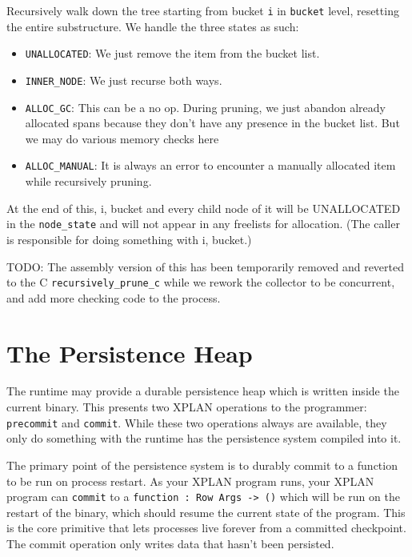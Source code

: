 Recursively walk down the tree starting from bucket \lstinline|i| in
\lstinline|bucket| level, resetting the entire substructure. We handle the
three states as such:

\begin{itemize}
\item \lstinline|UNALLOCATED|: We just remove the item from the bucket list.
\item \lstinline|INNER_NODE|: We just recurse both ways.
\item \lstinline|ALLOC_GC|: This can be a no op. During pruning, we just abandon
  already allocated spans because they don't have any presence in the bucket
  list. But we may do various memory checks here 
\item \lstinline|ALLOC_MANUAL|: It is always an error to encounter a manually
  allocated item while recursively pruning.
\end{itemize}

At the end of this, {i, bucket} and every child node of it will be UNALLOCATED
in the \lstinline|node_state| and will not appear in any freelists for
allocation. (The caller is responsible for doing something with {i, bucket}.)

TODO: The assembly version of this has been temporarily removed and reverted to
the C \lstinline|recursively_prune_c| while we rework the collector to be
concurrent, and add more checking code to the process.


\section{The Persistence Heap}

The runtime may provide a durable persistence heap which is written inside the
current binary. This presents two XPLAN operations to the
programmer: \lstinline|precommit| and \lstinline|commit|. While these two
operations always are available, they only do something with the runtime has
the persistence system compiled into it.

The primary point of the persistence system is to durably commit to a function
to be run on process restart. As your XPLAN program runs, your XPLAN program
can \lstinline|commit| to a \lstinline|function : Row Args -> ()| which will be
run on the restart of the binary, which should resume the current state of the
program. This is the core primitive that lets processes live forever from a
committed checkpoint. The commit operation only writes data that hasn't been
persisted.

